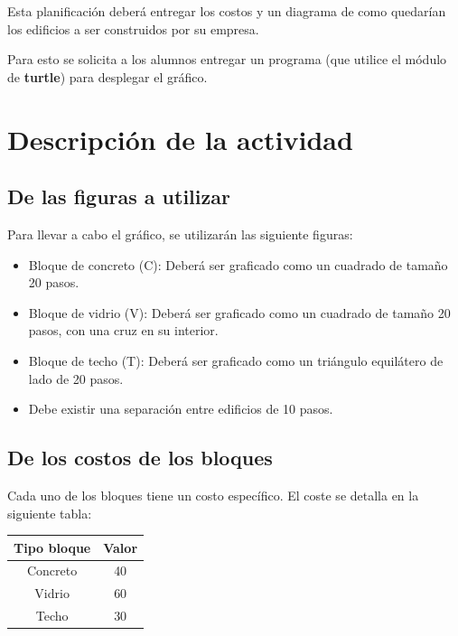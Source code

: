 \documentclass[]{article}
\begin{document}
    Esta planificación deberá entregar los costos y un diagrama de como quedarían los edificios a ser construidos por su empresa.

    Para esto se solicita a los alumnos entregar un programa (que utilice el módulo de \textbf{turtle}) para desplegar el gráfico.

    \section{Descripción de la actividad}
    \subsection{De las figuras a utilizar}
    Para llevar a cabo el gráfico, se utilizarán las siguiente figuras:

    \begin{itemize}
        \item Bloque de concreto (C): Deberá ser graficado como un cuadrado de tamaño 20 pasos.
        \item Bloque de vidrio (V): Deberá ser graficado como un cuadrado de tamaño 20 pasos, con una cruz en su interior.
        \item Bloque de techo (T): Deberá ser graficado como un triángulo equilátero de lado de 20 pasos.
        \item Debe existir una separación entre edificios de 10 pasos.
    \end{itemize}

    \subsection{De los costos de los bloques}
    Cada uno de los bloques tiene un costo específico. El coste se detalla en la siguiente tabla:\\

    \begin{center}
        \begin{tabular}{ |c|c| }
            \hline
            Tipo bloque & Valor \\
            \hline \hline
            Concreto & 40 \\
            \hline
            Vidrio & 60 \\
            \hline
            Techo & 30 \\
            \hline
        \end{tabular}
    \end{center}
\end{document}
